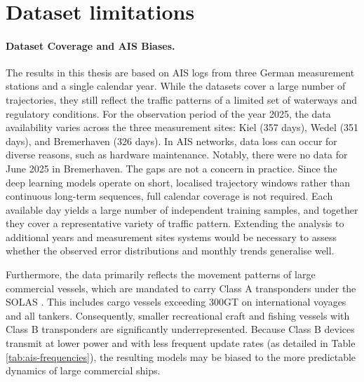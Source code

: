 \\
\section{Dataset limitations}

\paragraph{Dataset Coverage and AIS Biases.}
The results in this thesis are based on AIS logs from three German measurement stations and a single calendar year. While the datasets cover a large number of trajectories, they still reflect the traffic patterns of a limited set of waterways and regulatory conditions. For the observation period of the year 2025, the data availability varies across the three measurement sites: Kiel (357 days), Wedel (351 days), and Bremerhaven (326 days). In AIS networks,  data loss can occur for diverse reasons, such as hardware maintenance. Notably, there were no data for June 2025 in Bremerhaven. The gaps are not a concern in practice. Since the deep learning models operate on short, localised trajectory windows rather than continuous long-term sequences, full calendar coverage is not required. Each available day yields a large number of independent training samples, and together they cover a representative variety of traffic pattern. Extending the analysis to additional years and measurement sites systems would be necessary to assess whether the observed error distributions and monthly trends generalise well. 

Furthermore, the data primarily reflects the movement patterns of large commercial vessels, which are mandated to carry Class A transponders under the \ac{SOLAS} \parencite{solas2014}. This includes cargo vessels exceeding 300GT on international voyages and all tankers. Consequently, smaller recreational craft and fishing vessels with Class B transponders are significantly underrepresented. Because Class B devices transmit at lower power and with less frequent update rates (as detailed in Table \ref{tab:ais-frequencies}), the resulting models may be biased to the more predictable dynamics of large commercial ships.

